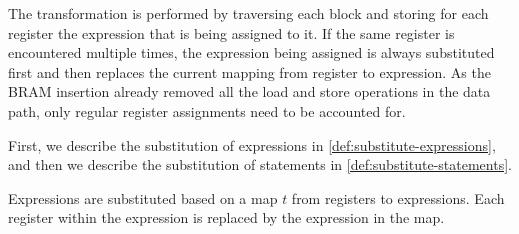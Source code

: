 \newcommand\substmap{t}
\newcommand\substexpr[2]{\texttt{subst\_expr}\ #1\ #2}
\newcommand\subststmnt[2]{\texttt{subst\_stmnt}\ #1\ #2}
\newcommand\invinsubstmap[4]{\texttt{in\_subst\_map}\ #1\ #2\ #3\ #4}
\newcommand\invnotinsubstmap[3]{\texttt{not\_in\_subst\_map}\ #1\ #2\ #3}

The transformation is performed by traversing each block and storing for each
register the expression that is being assigned to it.  If the same register is
encountered multiple times, the expression being assigned is always substituted
first and then replaces the current mapping from register to expression.  As the
BRAM insertion already removed all the load and store operations in the data
path, only regular register assignments need to be accounted for.

First, we describe the substitution of expressions in
\cref{def:substitute-expressions}, and then we describe the substitution of
statements in \cref{def:substitute-statements}.

\begin{definition}%
  \label{def:substitute-expressions}

  Expressions are substituted based on a map $\substmap$ from registers to
  expressions.  Each register within the expression is replaced by the
  expression in the map.

\end{definition}

